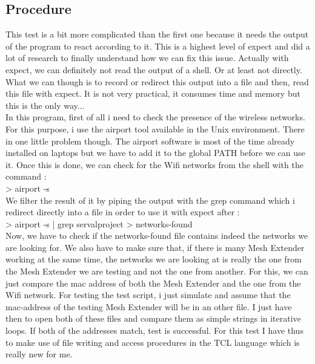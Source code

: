 \subsection{Procedure}
This test is a bit more complicated than the first one because it needs the output of the program to react according to it. This is a highest level of expect and did a lot of research to finally understand how we can fix this issue. Actually with expect, we can definitely not read the output of a shell. Or at least not directly. What we can though is to record or redirect this output into a file and then, read this file with expect. It is not very practical, it consumes time and memory but this is the only way... \\
In this program, first of all i need to check the presence of the wireless networks. For this purpose, i use the airport tool available in the Unix environment. There in one little problem though. The airport software is most of the time already installed on laptops but we have to add it to the global PATH before we can use it. Once this is done, we can check for the Wifi networks from the shell with the command : \\
> airport -s \\
We filter the result of it by piping the output with the grep command which i redirect directly into a file in order to use it with expect after : \\
> airport -s | grep servalproject > networks-found  \\
Now, we have to check if the networks-found file contains indeed the networks we are looking for. We also have to make sure that, if there is many Mesh Extender working at the same time, the networks we are looking at is really the one from the Mesh Extender we are testing and not the one from another. For this, we can just compare the mac address of both the Mesh Extender and the one from the Wifi network. For testing the test script, i just simulate and assume that the mac-address of the testing Mesh Extender will be in an other file. I just have then to open both of these files and compare them as simple strings in iterative loops. If both of the addresses match, test is successful. For this test I have thus to make use of file writing and access procedures in the TCL language which is really new for me. 

